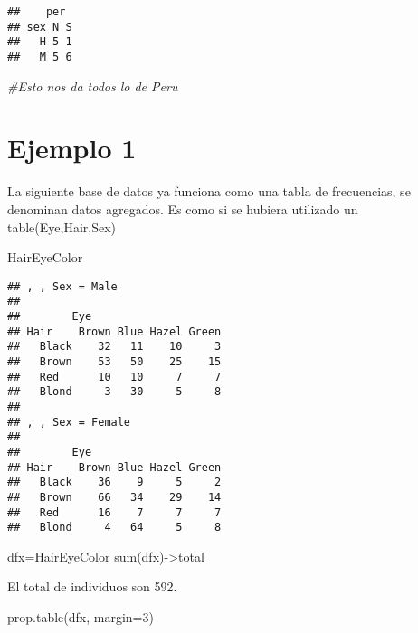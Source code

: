 \documentclass[
]{article}
\newenvironment{Shaded}{\begin{snugshade}}{\end{snugshade}}
\newcommand{\AttributeTok}[1]{\textcolor[rgb]{0.77,0.63,0.00}{#1}}
\newcommand{\CommentTok}[1]{\textcolor[rgb]{0.56,0.35,0.01}{\textit{#1}}}
\newcommand{\DecValTok}[1]{\textcolor[rgb]{0.00,0.00,0.81}{#1}}
\newcommand{\FunctionTok}[1]{\textcolor[rgb]{0.00,0.00,0.00}{#1}}
\newcommand{\NormalTok}[1]{#1}
\newcommand{\OtherTok}[1]{\textcolor[rgb]{0.56,0.35,0.01}{#1}}
\begin{document}
\begin{verbatim}
##    per
## sex N S
##   H 5 1
##   M 5 6
\end{verbatim}

\begin{Shaded}
\begin{Highlighting}[]
\CommentTok{\#Esto nos da todos lo de Peru}
\end{Highlighting}
\end{Shaded}

\hypertarget{ejemplo-1}{%
\section{Ejemplo 1}\label{ejemplo-1}}

La siguiente base de datos ya funciona como una tabla de frecuencias, se
denominan datos agregados. Es como si se hubiera utilizado un
table(Eye,Hair,Sex)

\begin{Shaded}
\begin{Highlighting}[]
\NormalTok{HairEyeColor}
\end{Highlighting}
\end{Shaded}

\begin{verbatim}
## , , Sex = Male
## 
##        Eye
## Hair    Brown Blue Hazel Green
##   Black    32   11    10     3
##   Brown    53   50    25    15
##   Red      10   10     7     7
##   Blond     3   30     5     8
## 
## , , Sex = Female
## 
##        Eye
## Hair    Brown Blue Hazel Green
##   Black    36    9     5     2
##   Brown    66   34    29    14
##   Red      16    7     7     7
##   Blond     4   64     5     8
\end{verbatim}

\begin{Shaded}
\begin{Highlighting}[]
\NormalTok{dfx}\OtherTok{=}\NormalTok{HairEyeColor}
\FunctionTok{sum}\NormalTok{(dfx)}\OtherTok{{-}\textgreater{}}\NormalTok{total}
\end{Highlighting}
\end{Shaded}

El total de individuos son 592.

\begin{Shaded}
\begin{Highlighting}[]
\FunctionTok{prop.table}\NormalTok{(dfx, }\AttributeTok{margin=}\DecValTok{3}\NormalTok{)}
\end{Highlighting}
\end{Shaded}
\end{document}
